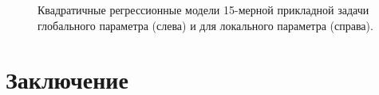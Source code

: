 \documentclass[11pt, oneside, a4paper]{article}
\begin{document}
\begin{figure}[h!]
\begin{minipage}{0.5\linewidth}
\end{minipage}
\begin{minipage}{0.5\linewidth}
\end{minipage}
\caption{Квадратичные регрессионные модели 15-мерной прикладной задачи глобального параметра (слева) и для локального параметра (справа).}
\label{fig}
\end{figure}

\section{Заключение}
\end{document}
